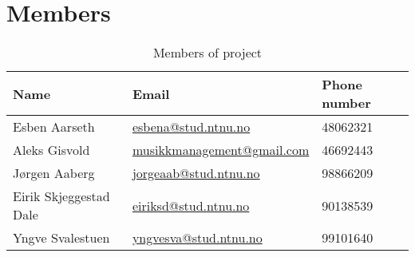 \section{Members}

\vspace{11pt} %
\begin{table}[h]
\begin{center}
\begin{tabular}{|p{4cm}|p{5cm}|p{5cm}|}   
\hline      
\bf{Name} & \bf{Email} & \bf{Phone number} \\ 
\hline
Esben Aarseth & \href{mailto:esbena@stud.ntnu.no}{esbena@stud.ntnu.no} & 48062321   \\     
\hline
Aleks Gisvold & \href{mailto:musikkmanagement@gmail.com}{musikkmanagement@gmail.com}
& 46692443 \\
\hline
Jørgen Aaberg & \href{mailto:jorgeaab@stud.ntnu.no}{jorgeaab@stud.ntnu.no} &
98866209 \\
\hline
Eirik Skjeggestad Dale & \href{mailto:eiriksd@stud.ntnu.no}{eiriksd@stud.ntnu.no}
& 90138539\\
\hline
Yngve Svalestuen & \href{mailto:yngvesva@stud.ntnu.no}{yngvesva@stud.ntnu.no} & 99101640 \\
\hline

 \end{tabular}
 \caption[Members of project]{Members of project}
\end{center}

\end{table}
